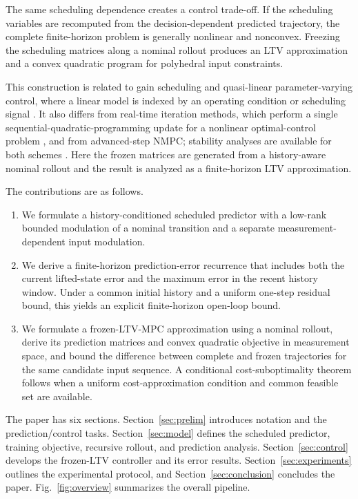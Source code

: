 \documentclass[journal]{IEEEtran}
\begin{document}
The same scheduling dependence creates a control trade-off. If the scheduling variables are recomputed from the decision-dependent predicted trajectory, the complete finite-horizon problem is generally nonlinear and nonconvex. Freezing the scheduling matrices along a nominal rollout produces an LTV approximation and a convex quadratic program for polyhedral input constraints.

This construction is related to gain scheduling and quasi-linear parameter-varying control, where a linear model is indexed by an operating condition or scheduling signal \cite{rugh2000gain,leith1998velocity,cisneros2016qlmpc,cisneros2020qlpv}. It also differs from real-time iteration methods, which perform a single sequential-quadratic-programming update for a nonlinear optimal-control problem \cite{diehl2005realtime,gros2020rti}, and from advanced-step NMPC; stability analyses are available for both schemes \cite{diehl2005rtistability,zavala2009advancedstep}. Here the frozen matrices are generated from a history-aware nominal rollout and the result is analyzed as a finite-horizon LTV approximation.

The contributions are as follows.
\begin{enumerate}
    \item We formulate a history-conditioned scheduled predictor with a low-rank bounded modulation of a nominal transition and a separate measurement-dependent input modulation.
    \item We derive a finite-horizon prediction-error recurrence that includes both the current lifted-state error and the maximum error in the recent history window. Under a common initial history and a uniform one-step residual bound, this yields an explicit finite-horizon open-loop bound.
    \item We formulate a frozen-LTV-MPC approximation using a nominal rollout, derive its prediction matrices and convex quadratic objective in measurement space, and bound the difference between complete and frozen trajectories for the same candidate input sequence. A conditional cost-suboptimality theorem follows when a uniform cost-approximation condition and common feasible set are available.
\end{enumerate}

The paper has six sections. Section~\ref{sec:prelim} introduces notation and the prediction/control tasks. Section~\ref{sec:model} defines the scheduled predictor, training objective, recursive rollout, and prediction analysis. Section~\ref{sec:control} develops the frozen-LTV controller and its error results. Section~\ref{sec:experiments} outlines the experimental protocol, and Section~\ref{sec:conclusion} concludes the paper. Fig.~\ref{fig:overview} summarizes the overall pipeline.
\end{document}
